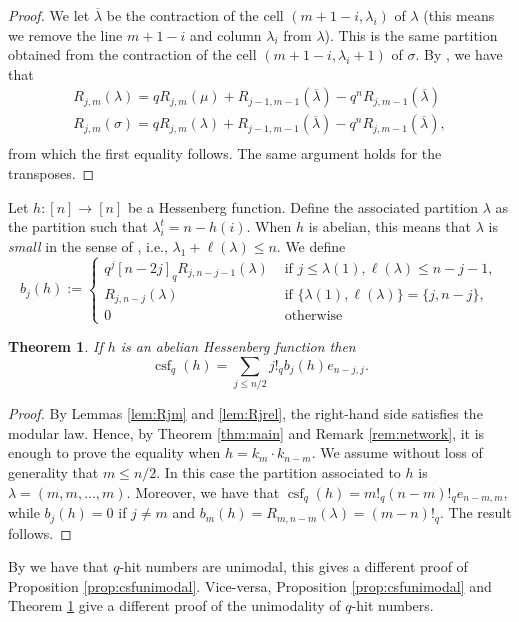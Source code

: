\documentclass[10pt]{amsart}
\newtheorem{Thm}[Lem]{Theorem}
\theoremstyle{definition}
\newcommand{\col}{\colon}
\newcommand{\ol}{\overline}
\DeclareMathOperator{\csf}{csf}
\begin{document}
\begin{proof}
We let $\ol{\lambda}$ be the contraction of the cell $(m+1-i,\lambda_i)$ of $\lambda$  (this means we remove the line $m+1-i$ and column $\lambda_i$ from $\lambda$). This is the same partition obtained from the contraction of the cell $(m+1-i,\lambda_i+1)$ of $\sigma$. By \cite[Theorem 6.11]{Dworkin}, we have that
\begin{align*}
R_{j,m}(\lambda)=qR_{j,m}(\mu)+R_{j-1,m-1}(\ol{\lambda})-q^nR_{j,m-1}(\ol{\lambda})\\
R_{j,m}(\sigma)=qR_{j,m}(\lambda)+R_{j-1,m-1}(\ol{\lambda})-q^nR_{j,m-1}(\ol{\lambda}),\\
\end{align*}
from which the first equality follows. The same argument holds for the transposes.
\end{proof}


Let $h\col[n]\to[n]$ be a Hessenberg function. Define the associated partition $\lambda$ as the partition such that $\lambda^{t}_i=n-h(i)$. When $h$ is abelian, this means that $\lambda$ is \emph{small} in the sense of \cite{StanStem}, i.e., $\lambda_1+\ell(\lambda)\leq n$. We define
\[
b_{j}(h):=\begin{cases}
q^j[n-2j]_qR_{j,n-j-1}(\lambda)& \text{ if }j\leq \lambda(1),\ell(\lambda)\leq n-j-1,\\
R_{j,n-j}(\lambda)&\text{ if }\{\lambda(1),\ell(\lambda)\}=\{j,n-j\},\\
0& \text{ otherwise }
\end{cases}
\]

\begin{Thm}
\label{thm:qhit}
If $h$ is an abelian Hessenberg function then
\[
\csf_q(h)=\sum_{j\leq n/2}j!_qb_{j}(h)e_{n-j,j}.
\]
\end{Thm}
\begin{proof}
By Lemmas \ref{lem:Rjm} and \ref{lem:Rjrel}, the right-hand side satisfies the modular law. Hence, by Theorem \ref{thm:main} and Remark \ref{rem:network}, it is enough to prove the equality when $h=k_m\cdot k_{n-m}$. We assume without loss of generality that $m\leq n/2$.  In this case the partition associated to $h$ is $\lambda=(m,m,\ldots,m)$. Moreover, we have that $\csf_q(h)=m!_q(n-m)!_qe_{n-m,m}$, while $b_{j}(h)=0$ if $j\neq m$ and $b_{m}(h)=R_{m,n-m}(\lambda)=(m-n)!_q$. The result follows.
\end{proof}
 By \cite[Theorem 6]{Hag98} we have that $q$-hit numbers are unimodal, this gives a different proof of Proposition \ref{prop:csfunimodal}. Vice-versa, Proposition \ref{prop:csfunimodal} and Theorem \ref{thm:qhit} give a different proof of the unimodality of $q$-hit numbers.
\end{document}
